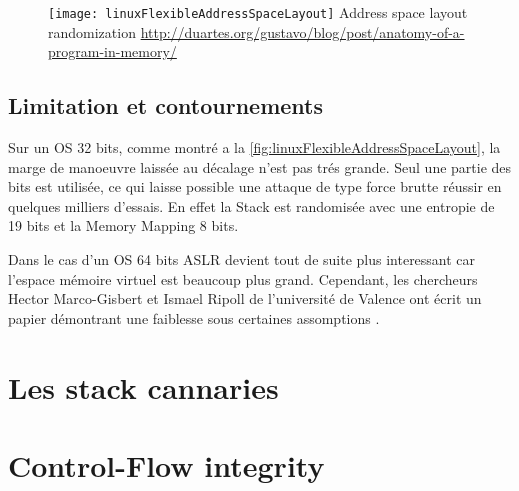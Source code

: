 \begin{figure}[H]
	\centering
	\texttt{[image: linuxFlexibleAddressSpaceLayout]}
	{Address space layout randomization}
	{\url{http://duartes.org/gustavo/blog/post/anatomy-of-a-program-in-memory/}}
	\label{fig:linuxFlexibleAddressSpaceLayout}
\end{figure}

\subsection{Limitation et contournements}

Sur un OS 32 bits, comme montré a la \autoref{fig:linuxFlexibleAddressSpaceLayout}, la marge de manoeuvre laissée au décalage n'est pas trés grande. Seul une partie des bits est utilisée, ce qui laisse possible une attaque de type force brutte réussir en quelques milliers d'essais. En effet la Stack est randomisée avec une entropie de 19 bits et la Memory Mapping 8 bits.

Dans le cas d'un OS 64 bits ASLR devient tout de suite plus interessant car l'espace mémoire virtuel est beaucoup plus grand. Cependant, les chercheurs Hector Marco-Gisbert et Ismael Ripoll de l'université de Valence ont écrit un papier démontrant une faiblesse sous certaines assomptions \cite{EffectivenessFullASLR64bit}.

\section{Les stack cannaries}




\section{Control-Flow integrity}




